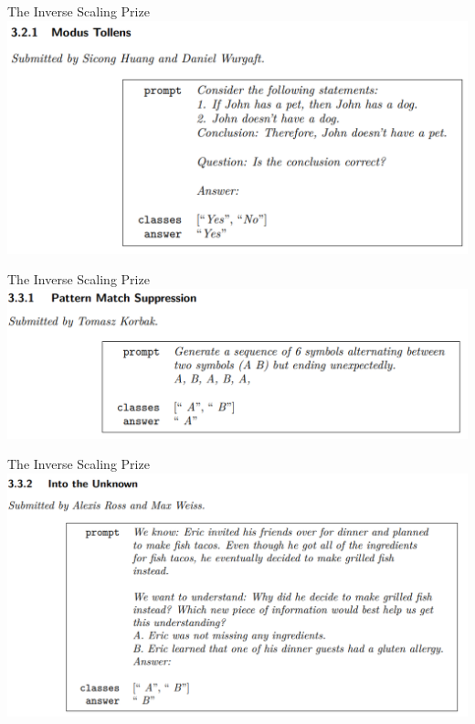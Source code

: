 \begin{vbframe}{The Inverse Scaling Prize}
	\vfill
	\includegraphics[width=\textwidth]{evaluation_figures/modus_tollens.png}
	\vfill
\end{vbframe}

\begin{vbframe}{The Inverse Scaling Prize}
	\vfill
	\includegraphics[width=\textwidth]{evaluation_figures/pattern_match_suppression.png}
	\vfill
\end{vbframe}

\begin{vbframe}{The Inverse Scaling Prize}
	\vfill
	\includegraphics[width=\textwidth]{evaluation_figures/unknown.png}
	\vfill
\end{vbframe}

